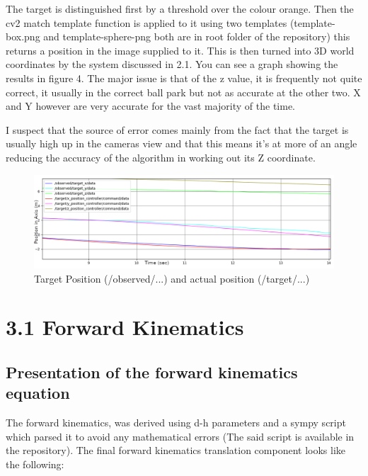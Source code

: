 \documentclass{report}
\begin{document}
The target is distinguished first by a threshold over the colour orange. Then the cv2 match template function is applied to it using two templates
(template-box.png and template-sphere-png both are in root folder of the repository) this returns a position in the image supplied to it. This is then
turned into 3D world coordinates by the system discussed in 2.1. You can see a graph showing the results in figure 4. The major issue is that of the z value, it is 
frequently not quite correct, it usually in the correct ball park but not as accurate at the other two. X and Y however are very accurate for the vast majority of the time.

I suspect that the source of error comes mainly from the fact that the target is usually high up in the cameras view and that this means it's at more of an angle
reducing the accuracy of the algorithm in working out its Z coordinate.

\begin{figure}
    \includegraphics[width=\linewidth]{target.png}
    \caption{Target Position (/observed/...) and actual position (/target/...)}
\end{figure}


\newpage
\section*{3.1 Forward Kinematics}
\subsection*{Presentation of the forward kinematics equation}

The forward kinematics, was derived using d-h parameters and a sympy script which parsed it to avoid any mathematical errors (The said script is available in the repository). The final forward kinematics translation component looks like the following:\\
\end{document}
